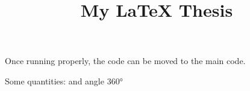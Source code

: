 \documentclass[ms-thesis,mathdesign,chapterrefs,showgrid]{ndsu-thesis-tagged}%
\title{\voh My \LaTeX{} Thesis}
\begin{document}

\checkBeginRefsection%


  Once running properly, the code can be moved to the main code. 

\start   Some quantities:  and angle \ang{360}








\checkEndRefsection%
\checkMakeCombinedReferences%
\end{document}
